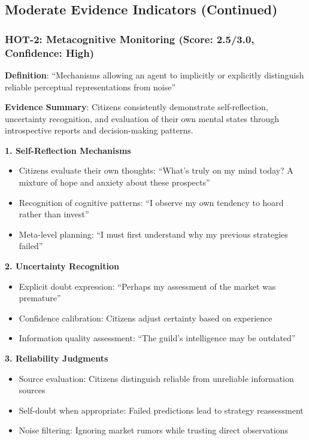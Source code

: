 

\subsection{Moderate Evidence Indicators (Continued)}

\subsubsection{HOT-2: Metacognitive Monitoring (Score: 2.5/3.0, Confidence: High)}

\textbf{Definition}: ``Mechanisms allowing an agent to implicitly or explicitly distinguish reliable perceptual representations from noise''

\textbf{Evidence Summary}: Citizens consistently demonstrate self-reflection, uncertainty recognition, and evaluation of their own mental states through introspective reports and decision-making patterns.

\textbf{1. Self-Reflection Mechanisms}
\begin{itemize}
    \item Citizens evaluate their own thoughts: ``What's truly on my mind today? A mixture of hope and anxiety about these prospects''
    \item Recognition of cognitive patterns: ``I observe my own tendency to hoard rather than invest''
    \item Meta-level planning: ``I must first understand why my previous strategies failed''
\end{itemize}

\textbf{2. Uncertainty Recognition}
\begin{itemize}
    \item Explicit doubt expression: ``Perhaps my assessment of the market was premature''
    \item Confidence calibration: Citizens adjust certainty based on experience
    \item Information quality assessment: ``The guild's intelligence may be outdated''
\end{itemize}

\textbf{3. Reliability Judgments}
\begin{itemize}
    \item Source evaluation: Citizens distinguish reliable from unreliable information sources
    \item Self-doubt when appropriate: Failed predictions lead to strategy reassessment
    \item Noise filtering: Ignoring market rumors while trusting direct observations
\end{itemize}


